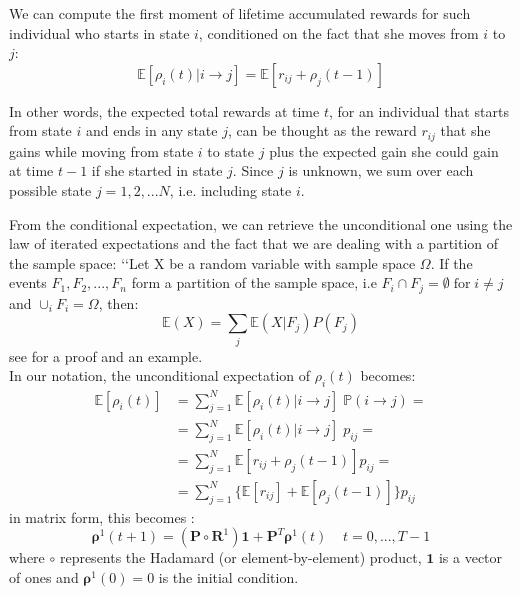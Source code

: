 \documentclass[\main/main.tex]{subfiles}
\begin{document}
We can compute the first moment of lifetime accumulated rewards for such individual who starts in state $i$, conditioned on the fact that she moves from $i$ to $j$:
    \begin{equation}
        \mathds{E}[ \rho_i(t) | i \rightarrow j] = \mathds{E}[ r_{ij} + \rho_j(t-1) ]
    \end{equation}

In other words, the expected total rewards at time $t$, for an individual that starts from state $i$ and ends in any state $j$, can be thought as the reward $r_{ij}$ that she gains while moving from state $i$ to state $j$ plus the expected gain she could gain at time $t-1$ if she started in state $j$. Since $j$ is unknown, we sum over each possible state $j = 1,2, ...N$, i.e. including state $i$.
    
    
From the conditional expectation, we can retrieve the unconditional one using the law of iterated expectations and the fact that we are dealing with a partition of the sample space: \lq\lq Let X be a random variable with sample space $\Omega$. If the events $F_1, F_2, ..., F_n$ form a partition of the sample space, i.e $F_i \cap F_j = \emptyset \; \text{for} \; i \neq j$ and $\cup_i F_i = \Omega$, then:
\begin{equation}
\mathds{E} (X) = \sum_j \mathds{E}(X | F_j) P(F_j)
\end{equation}
see \cite{Grinstead1997} for a proof and an example.\\



\noindent In our notation, the unconditional expectation of $ \rho_i(t) $ becomes:
    \begin{equation}\label{unconditional}
    \begin{split}
         \mathds{E}[ \rho_i(t)] &= \sum_{j=1}^N \mathds{E}[\rho_i(t) | i \rightarrow j] \; \mathds{P}( i \rightarrow j) = \\
         &= \sum_{j=1}^N  \mathds{E}[\rho_i(t) | i \rightarrow j]\; p_{ij} =\\
         &= \sum_{j=1}^N    \mathds{E}[ r_{ij} + \rho_j(t-1)]  p_{ij} = \\
         &= \sum_{j=1}^N  \{  \mathds{E}[ r_{ij}] + \mathds{E}[\rho_j(t-1)]\}  p_{ij}
    \end{split}
    \end{equation}
in matrix form, this becomes \citep{Caswell2011}:
\begin{equation}
        \bm{\rho}^1(t+1) = (\mathbf{P} \circ \mathbf{R}^1) \mathbf{1} + \mathbf{P}^T \bm{\rho}^1(t) \;\;\;\; t=0,..., T-1
\end{equation}
where $\circ$ represents the Hadamard (or element-by-element) product, $\mathbf{1}$ is a vector of ones and $\bm{\rho}^1(0) = 0$ is the initial condition.\\
\end{document}
